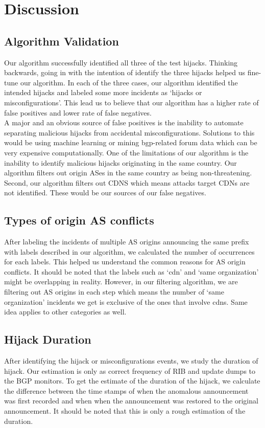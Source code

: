  \section{Discussion}\label{sec:discussion}
\subsection{Algorithm Validation}
Our algorithm successfully identified all three of the test hijacks. Thinking backwards, going in with the intention of identify the three hijacks helped us fine-tune our algorithm. In each of the three cases, our algorithm identified the intended hijacks and labeled some more incidents as `hijacks or misconfigurations'. This lead us to believe that our algorithm has a higher rate of false positives and lower rate of false negatives.\\
A major and an obvious source of false positives is the inability to automate separating malicious hijacks from accidental misconfigurations. Solutions to this would be using machine learning or mining bgp-related forum data which can be very expensive computationally. One of the limitations of our algorithm is the inability to identify malicious hijacks originating in the same country. Our algorithm filters out origin ASes in the same country as being non-threatening. Second, our algorithm filters out CDNS which means attacks target CDNs are not identified. These would be our sources of our false negatives. 
\subsection{Types of origin AS conflicts}
After labeling the incidents of multiple AS origins announcing the same prefix with labels described in our algorithm, we calculated the number of occurrences for each labels. This helped us understand the common reasons for AS origin conflicts. It should be noted that the labels such as `cdn' and `same organization' might be overlapping in reality. However, in our filtering algorithm, we are filtering out AS origins in each step which means the number of `same organization' incidents we get is exclusive of the ones that involve cdns. Same idea applies to other categories as well.
\subsection{Hijack Duration}
After identifying the hijack or misconfigurations events, we study the duration of hijack. Our estimation is only as correct frequency of RIB and update dumps to the BGP monitors. To get the estimate of the duration of the hijack, we calculate the difference between the time stamps of when the anomalous announcement was first recorded and when when the announcement was restored to the original announcement. It should be noted that this is only a rough estimation of the duration. 

